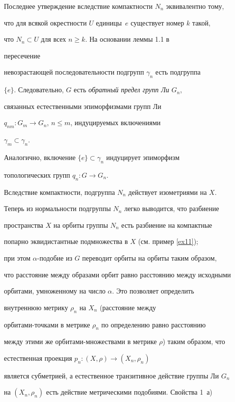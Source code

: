 \begin{pf}
Последнее утверждение вследствие компактности $N_{n}$ эквивалентно тому,


что для всякой окрестности $U$ единицы~$e$ существует номер $k$ такой,


что $N_{n}\subset U$ для всех $n \geq k$. На основании леммы 1.1 в


\cite{B3} пересечение


невозрастающей последовательности подгрупп $\gamma_{n}$ есть подгруппа


$\{e\}$. Следовательно, $G$ есть {\it обратный предел групп Ли} $G_{n}$,


связанных естественными эпиморфизмами групп Ли


$q_{nm}: G_{m} \rightarrow G_{n}$, $n \leq m$, индуцируемых включениями


$\gamma_{m} \subset \gamma_{n}$.


Аналогично, включение $\{e\}\subset \gamma_{n}$ индуцирует эпиморфизм


топологических групп $q_{n}: G \rightarrow G_{n}$.





Вследствие компактности, подгруппа $N_{n}$ действует изометриями на $X$.


Теперь из нормальности подгруппы $N_{n}$ легко выводится, что разбиение


пространства $X$ на орбиты группы $N_{n}$ есть разбиение на компактные


попарно эквидистантные подмножества в $X$ (см. пример \ref{ex11});


при этом $\alpha$-подобие из $G$ переводит орбиты на орбиты таким образом,


что расстояние между образами орбит равно расстоянию между исходными


орбитами, умноженному на число $\alpha$. Это позволяет определить


внутреннюю метрику $\rho_{n}$ на $X_{n}$ (расстояние между 


орбитами-точками в метрике $\rho_{n}$ по определению равно расстоянию


между этими же орбитами-множествами в метрике $\rho$) таким образом, что


естественная проекция $p_{n}: (X,\rho) \rightarrow (X_{n},\rho_{n})$


является субметрией, а естественное транзитивное действие группы Ли $G_{n}$


на $(X_{n},\rho_{n})$ есть действие метрическими подобиями. Свойства 1~а)



\end{pf}
